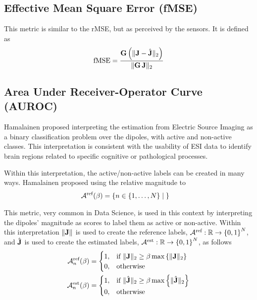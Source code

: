\subsection{Effective Mean Square Error (fMSE)}

This metric is similar to the rMSE, but as perceived by the sensors.
%
It is defined as
\begin{equation}
\text{fMSE} = 
\frac{\mathbf{G}\left( \lVert \mathbf{J} - \hat{\mathbf{J}} \rVert_2 \right)}{\lVert \mathbf{G}\, \mathbf{J} \rVert_2}
\end{equation}

\subsection{Area Under Receiver-Operator Curve (AUROC)}

Hamalainen proposed interpreting the estimation from Electric Source Imaging as a binary classification problem over the dipoles, with active and non-active classes.
%
This interpretation is consistent with the usability of ESI data to identify brain regions related to specific cognitive or pathological processes.

Within this interpretation, the active/non-active labels can be created in many ways. 
%
Hamalainen proposed using the relative magnitude to 
\begin{align}
\mathcal{A}^{\text{ref}}(\beta)
&=
\left\{ n\in\left\{ 1, \dots, N \right\} \;\middle|\;   \right\}
\end{align}

This metric, very common in Data Science, is used in this context by interpreting the dipoles' magnitude as scores to label them as active or non-active.
%
Within this interpretation $\lVert \mathbf{J} \rVert$ is used to create the reference labels, $\mathcal{A}^{\text{ref}}: \mathbb{R} \rightarrow \left\{ 0,1 \right\}^N$, and $\hat{\mathbf{J}}$ is used to create the estimated labels, $\mathcal{A}^{\text{est}}: \mathbb{R} \rightarrow \left\{ 0,1 \right\}^N$, as follows
\begin{align}
\mathcal{A}_n^{\text{ref}}(\beta)
&=
\begin{cases}
1, &\text{if }
\lVert \mathbf{J} \rVert_2 \geq \beta \max\left\{ \lVert \mathbf{J} \rVert_2 \right\}
\\
0, &\text{otherwise}
\end{cases}
\\
\mathcal{A}_n^{\text{est}}(\beta)
&=
\begin{cases}
1, &\text{if }
\lVert \hat{\mathbf{J}} \rVert_2 \geq \beta \max\left\{ \lVert \hat{\mathbf{J}} \rVert_2 \right\}
\\
0, &\text{otherwise}
\end{cases}
\end{align}


